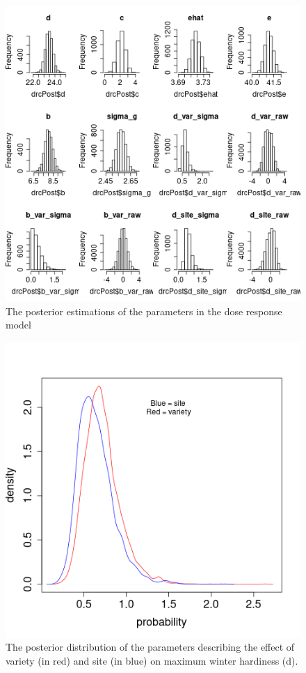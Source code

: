 \documentclass[11pt,letter]{article}
\begin{document}
\begin{figure}
  \includegraphics[scale = 0.75]{Parameters.png}
  \caption{The posterior estimations of the parameters in the dose response model}
  \label{fig:postParameters}
\end{figure}

\begin{figure}
  \includegraphics[scale = 0.75]{VarSiteD.png}
  \caption{The posterior distribution of the parameters describing the effect of variety (in red) and site (in blue) on maximum winter hardiness (d).  }
  \label{fig:VarSiteD}
\end{figure}
\end{document}
